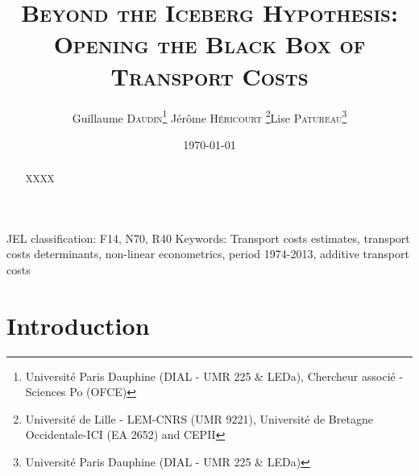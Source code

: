 \documentclass[a4paper,11pt]{article}
\begin{document}
\date{\today}
\title{\textsc{Beyond the Iceberg Hypothesis: \\Opening the Black Box of Transport Costs}} %
\author{Guillaume \textsc{Daudin}\thanks{%
Universit\'{e} Paris Dauphine (DIAL - UMR 225 \& LEDa), Chercheur associ\'{e} - Sciences Po (OFCE)}  \qquad J\'{e}r\^{o}me \textsc{H\'{e}ricourt} \thanks{Universit\'{e} de Lille - LEM-CNRS (UMR 9221), Universit\'{e} de Bretagne Occidentale-ICI (EA 2652) and CEPII}\qquad Lise \textsc{Patureau}\thanks{Universit\'{e} Paris Dauphine (DIAL - UMR 225 \& LEDa)} } \maketitle


\bigskip

\begin{abstract}


\begin{spacing}{1.2}

{\normalsize XXXX}

{\normalsize \bigskip }

\end{spacing}
\end{abstract}

\thispagestyle{empty} \pagestyle{plain} \setcounter{page}{1}



{\normalsize JEL classification: F14, N70, R40\newline
Keywords: Transport costs estimates, transport costs determinants, non-linear econometrics, period 1974-2013, additive transport costs }

{\normalsize \vspace{0cm} }

{\normalsize \titlepage }

{\normalsize \newpage }


\section{Introduction}
\end{document}
